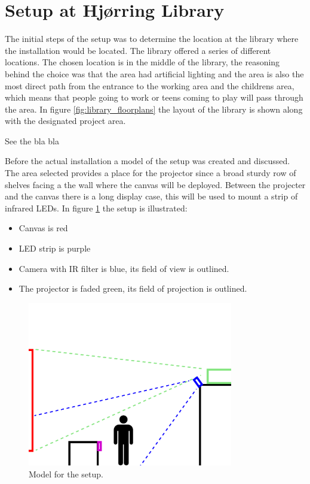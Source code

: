 \section{Setup at Hj{\o}rring Library}

The initial steps of the setup was to determine the location at the library where the installation would be located. The library offered a series of different locations. The chosen location is in the middle of the library, the reasoning behind the choice was that the area had artificial lighting and the area is also the most direct path from the entrance to the working area and the childrens area, which means that people going to work or teens coming to play will pass through the area. In figure \ref{fig:library_floorplans} the layout of the library is shown along with the designated project area.

See the bla bla \citep{5mm_led}


Before the actual installation a model of the setup was created and discussed. The area selected provides a  place for the projector since a broad sturdy row of shelves facing a the wall where the canvas will be deployed. Between the projecter and the canvas there is a long display case, this will be used to mount a strip of infrared LEDs. In figure \ref{fig:setup_model_person} the setup is illustrated:

\begin{itemize}
\item Canvas is red
\item LED strip is purple
\item Camera with IR filter is blue, its field of view is outlined.
\item The projector is faded green, its field of projection is outlined.
\end{itemize}

\begin{figure}[htbp] 
\centering 
\includegraphics[width=0.8\textwidth]{Pictures/Setup/sideview_camera_with_person.png} 
\caption{Model for the setup.} 
\label{fig:setup_model_person} 
\end{figure}


